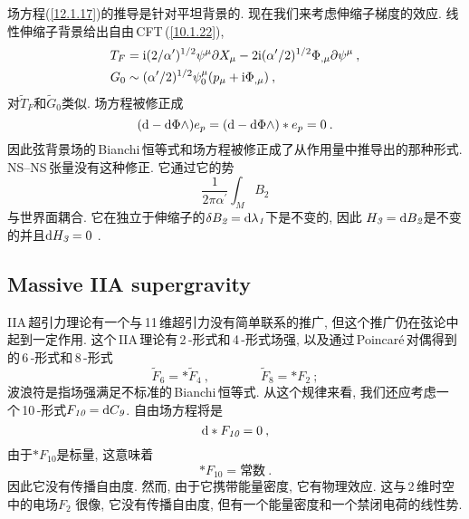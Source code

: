 场方程(\ref{12.1.17})的推导是针对平坦背景的. 现在我们来考虑伸缩子梯度的效应. 线性伸缩子背景给出自由\,CFT\,(\ref{10.1.22}),
\begin{subequations}
    \begin{align}
        T_{F}&=\mathrm{i}(2/\alpha^{\prime})^{1/2}\psi^{\mu}\partial X_{\mu}-2\mathrm{i}(\alpha^{\prime}/2)^{1/2}\Phi_{,\mu}\partial\psi^{\mu} \:, \label{12.1.18a} \\
        G_{0}&\sim (\alpha^{\prime}/2)^{1/2}\psi_{0}^{\mu}(p_{\mu}+\mathrm{i}\Phi_{,\mu}) \:, \label{12.1.18b}
    \end{align} \label{12.1.18}
\end{subequations}
对$ \tilde{T}_{F} $和$ \tilde{G}_{0} $类似. 场方程被修正成
\begin{equation}
    (\mathrm{d}-\mathrm{d}\Phi\wedge) e_{p}=(\mathrm{d}-\mathrm{d}\Phi\wedge)\ast e_{p} =0\:. \label{12.1.19}
\end{equation}
因此弦背景场的\,Bianchi\,恒等式和场方程被修正成了从作用量中推导出的那种形式. NS--NS\,张量没有这种修正. 它通过它的势
\begin{equation}
    \frac{1}{2\pi\alpha^{\prime}} \int_{M}B_{\textit{2}} \label{12.1.20}
\end{equation}
与世界面耦合. 它在独立于伸缩子的$ \delta B_{\textit{2}}=\mathrm{d}\lambda_{\textit{1}} $下是不变的, 因此 $H_{\textit{3}}=\mathrm{d} B_{\textit{2}} $是不变的并且$ \mathrm{d} H_{\textit{3}}=0$ .

\subsection*{Massive IIA supergravity}

IIA\,超引力理论有一个与\,11\,维超引力没有简单联系的推广, 但这个推广仍在弦论中起到一定作用. 这个\,IIA\,理论有\,2\,-形式和\,4\,-形式场强, 以及通过\,Poincar\'{e}\,对偶得到的\,6\,-形式和\,8\,-形式
\begin{equation}
    \tilde{F}_{\textit{6}}=\ast\tilde{F}_{\textit{4}}\:,\qquad \qquad 
    \tilde{F}_{\textit{8}}=\ast F_{\textit{2}}\:; \label{12.1.21}
\end{equation}
波浪符是指场强满足不标准的\,Bianchi\,恒等式. 从这个规律来看, 我们还应考虑一个\,10\,-形式$ F_{\textit{10}}=\mathrm{d} C_{\textit{9}}$. 自由场方程将是
\begin{equation}
    \mathrm{d} \ast F_{\textit{10}} =0 \:, \label{12.1.22}
\end{equation}
由于$ \ast F_{\textit{10}} $是标量, 这意味着
\begin{equation}
    \ast F_{\textit{10}} = \text{常数}\:. \label{12.1.23}
\end{equation}
因此它没有传播自由度. 然而, 由于它携带能量密度, 它有物理效应. 这与\,2\,维时空中的电场$ F_{\textit{2}}$ 很像, 它没有传播自由度, 但有一个能量密度和一个禁闭电荷的线性势.

